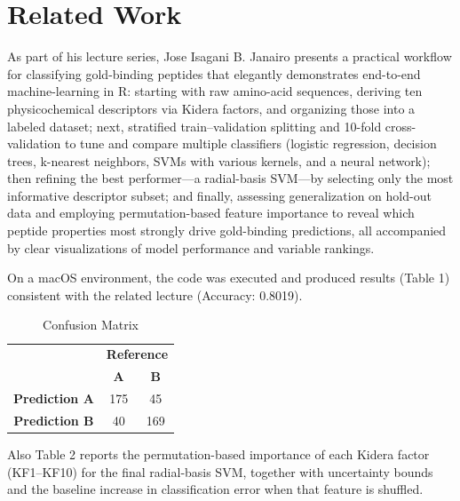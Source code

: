 \documentclass{article}
\begin{document}
\section{Related Work}
As part of his lecture series, Jose Isagani B. Janairo presents a practical workflow for classifying gold-binding peptides that elegantly demonstrates end-to-end machine-learning in R: starting with raw amino-acid sequences, deriving ten physicochemical descriptors via Kidera factors, and organizing those into a labeled dataset; next, stratified train–validation splitting and 10-fold cross-validation to tune and compare multiple classifiers (logistic regression, decision trees, k-nearest neighbors, SVMs with various kernels, and a neural network); then refining the best performer—a radial-basis SVM—by selecting only the most informative descriptor subset; and finally, assessing generalization on hold-out data and employing permutation-based feature importance to reveal which peptide properties most strongly drive gold-binding predictions, all accompanied by clear visualizations of model performance and variable rankings.

On a macOS environment, the code was executed and produced results (Table 1) consistent with the related lecture (Accuracy: 0.8019).

\begin{table}[h!]
\centering
\begin{tabular}{|c|c|c|}
\cline{2-3}
\multicolumn{1}{c|}{} & \multicolumn{2}{c|}{\textbf{Reference}} \\
\cline{2-3}
\multicolumn{1}{c|}{} & \textbf{A} & \textbf{B} \\
\hline
\textbf{Prediction A} & 175 & 45 \\
\textbf{Prediction B} & 40 & 169 \\
\hline
\end{tabular}
\caption{Confusion Matrix}
\end{table}

Also Table 2 reports the permutation-based importance of each Kidera factor (KF1–KF10) for the final radial‐basis SVM, together with uncertainty bounds and the baseline increase in classification error when that feature is shuffled.
\end{document}
